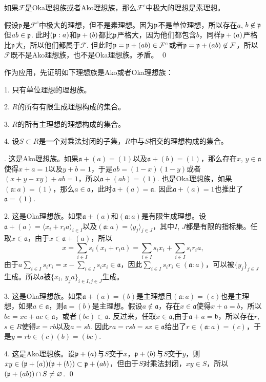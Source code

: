 \pro 如果$\mathcal{F}$是Oka理想族或者Ako理想族，那么$\mathcal{F}^c$中极大的理想是素理想。

\proof
	假设$\mathfrak{p}$是$\mathcal{F}^c$中极大的理想，但不是素理想。因为$\mathfrak{p}$不是单位理想，所以存在$a$, $b\not\in \mathfrak{p}$但$ab\in\mathfrak{p}$. 此时$(\mathfrak{p}:a)$和$\mathfrak{p}+(b)$都比$\mathfrak{p}$严格大，因为他们都包含$b$，同样$\mathfrak{p}+(a)$严格比$\mathfrak{p}$大，所以他们都属于$\mathcal{F}$. 但此时$\mathfrak{p}=\mathfrak{p}+(ab)\in \mathcal{F}^c$或者$\mathfrak{p}=\mathfrak{p}+(ab)\not\in \mathcal{F}$，所以$\mathcal{F}$既不是Ako理想族，也不是Oka理想族。矛盾。
\qed

作为应用，先证明如下理想族是Ako或者Oka理想族：

1. 只有单位理想的理想族。

2. $R$的所有有限生成理想构成的集合。

3. $R$的所有主理想的理想构成的集合。

4. 设$S\subset R$是一个对乘法封闭的子集，$R$中与$S$相交的理想构成的集合。

. 这是Ako理想族。如果$\mathfrak{a}+(a)=(1)$以及$\mathfrak{a}+(b)=(1)$，那么存在$x$, $y\in \mathfrak{a}$使得$x+a=1$以及$y+b=1$，于是$ab=(1-x)(1-y)$或者$(x+y-xy)+ab=1$，所以$\mathfrak{a}+(ab)=(1)$. 也是Oka理想族，如果$(\mathfrak{a}:a)=(1)$，那么$a\in \mathfrak{a}$，此时$\mathfrak{a}+(a)=\mathfrak{a}$. 因此$\mathfrak{a}+(a)=1$也推出了$\mathfrak{a}=(1)$.

	2. 这是Oka理想族。如果$\mathfrak{a}+(a)$和$(\mathfrak{a}:a)$是有限生成理想。设$\mathfrak{a}+(a)=\langle x_i+r_ia \rangle_{i\in I}$以及$(\mathfrak{a}:a)=\langle y_j\rangle_{j\in J}$，其中$I$, $J$都是有限的指标集。任取$x\in \mathfrak{a}$，由于$x\in \mathfrak{a}+(a)$，所以
	\[
		x= \sum_{i\in I}s_i(x_i+r_ia)=\sum_{i\in I}s_ix_i+\sum_{i\in I}s_ir_ia,
	\]
	由于$a\sum_{i\in I}s_ir_i=x-\sum_{i\in I}s_ix_i\in \mathfrak{a}$，因此$\sum_{i\in I}s_ir_i\in (\mathfrak{a}:a)$，可以被$\{y_j\}_{j\in J}$生成。所以$\mathfrak{a}$被$\{x_i$, $y_ja\}_{i\in I,j\in J}$生成。

	3. 这是Oka理想族。如果$\mathfrak{a}+(a)=(b)$是主理想且$(\mathfrak{a}:a)=(c)$也是主理想，如果$a\in \mathfrak{a}$，则$\mathfrak{a}=(b)$是主理想。假设$a\not\in\mathfrak{a}$，存在$x\in \mathfrak{a}$使得$x+a=b$，所以$bc=xc+ac\in \mathfrak{a}$，或者$(bc)\subset \mathfrak{a}$. 反过来，任取$x\in \mathfrak{a}$,由于$\mathfrak{a}+a=\mathfrak{b}$，所以存在$r$, $s\in R$使得$x=rb$以及$a=sb$. 因此$ra=rsb=sx\in\mathfrak{a}$给出了$r\in (\mathfrak{a}:a)=(c)$，于是$y=rb\in (c)(b)=(bc)$.

	4. 这是Ako理想族。设$\mathfrak{p}+(a)$与$S$交于$x$，$\mathfrak{p}+(b)$与$S$交于$y$，则$xy\in (\mathfrak{p}+(a))(\mathfrak{p}+(b))\subset \mathfrak{p}+(ab)$，但由于$S$对乘法封闭，$xy\in S$，所以$(\mathfrak{p}+(ab))\cap S\neq \varnothing$.
\qed

